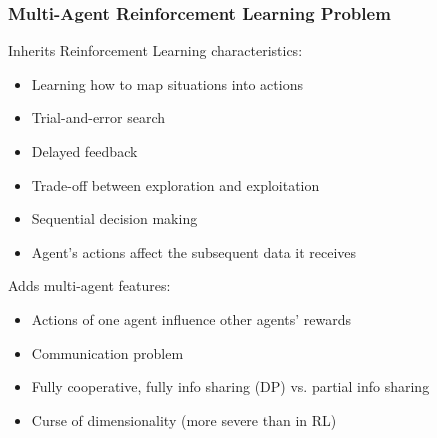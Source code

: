 \documentclass{beamer}
\begin{document}
    \begin{frame}
        \frametitle{Multi-Agent Reinforcement Learning Problem}
        Inherits Reinforcement Learning characteristics:
        \begin{itemize}
            \item Learning how to map situations into actions
            \item Trial-and-error search
            \item Delayed feedback
            \item Trade-off between exploration and exploitation
            \item Sequential decision making
            \item Agent's actions affect the subsequent data it receives
        \end{itemize}

        Adds multi-agent features:
        \begin{itemize}
            \item Actions of one agent influence other agents' rewards
            \item Communication problem
            \item Fully cooperative, fully info sharing (DP) vs. partial info sharing
            \item Curse of dimensionality (more severe than in RL)
        \end{itemize}

    \end{frame}



\end{document}
